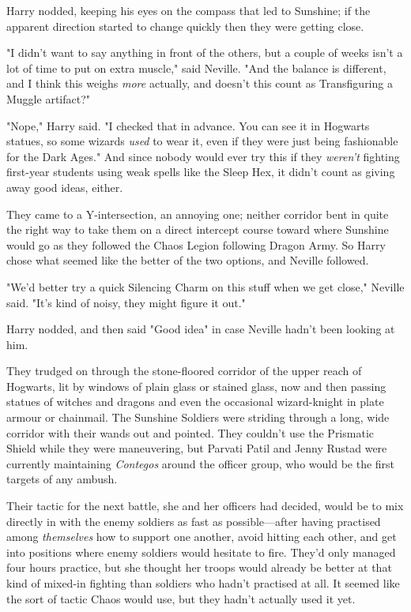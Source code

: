 Harry nodded, keeping his eyes on the compass that led to Sunshine; if the
apparent direction started to change quickly then they were getting close.

"I didn't want to say anything in front of the others, but a couple of weeks
isn't a lot of time to put on extra muscle," said Neville. "And the balance is
different, and I think this weighs \emph{more} actually, and doesn't this count
as Transfiguring a Muggle artifact?"

"Nope," Harry said. "I checked that in advance. You can see it in Hogwarts
statues, so some wizards \emph{used} to wear it, even if they were just being
fashionable for the Dark Ages." And since nobody would ever try this if they
\emph{weren't} fighting first-year students using weak spells like the Sleep
Hex, it didn't count as giving away good ideas, either.

They came to a Y-intersection, an annoying one; neither corridor bent in quite
the right way to take them on a direct intercept course toward where Sunshine
would go as they followed the Chaos Legion following Dragon Army. So Harry
chose what seemed like the better of the two options, and Neville followed.

"We'd better try a quick Silencing Charm on this stuff when we get close,"
Neville said. "It's kind of noisy, they might figure it out."

Harry nodded, and then said "Good idea" in case Neville hadn't been looking at
him.

They trudged on through the stone-floored corridor of the upper reach of
Hogwarts, lit by windows of plain glass or stained glass, now and then passing
statues of witches and dragons and even the occasional wizard-knight in plate
armour or chainmail.
\later
The Sunshine Soldiers were striding through a long, wide corridor with their
wands out and pointed. They couldn't use the Prismatic Shield while they were
maneuvering, but Parvati Patil and Jenny Rustad were currently maintaining
\emph{Contegos} around the officer group, who would be the first targets of any
ambush.

Their tactic for the next battle, she and her officers had decided, would be to
mix directly in with the enemy soldiers as fast as possible—after having
practised among \emph{themselves} how to support one another, avoid hitting
each other, and get into positions where enemy soldiers would hesitate to fire.
They'd only managed four hours practice, but she thought her troops would
already be better at that kind of mixed-in fighting than soldiers who hadn't
practised at all. It seemed like the sort of tactic Chaos would use, but they
hadn't actually used it yet.

